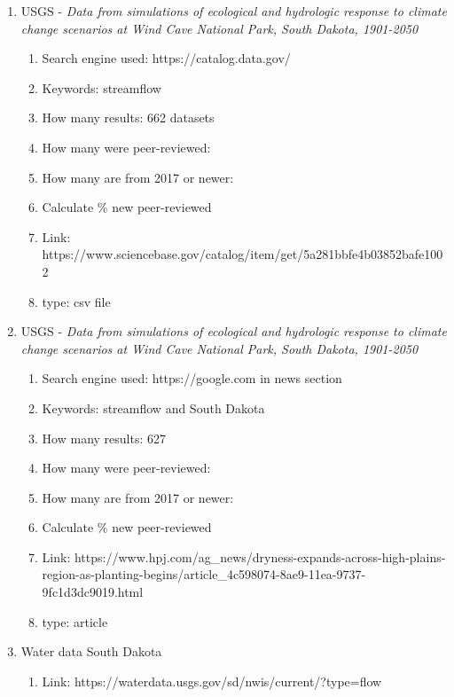 \documentclass{article}
\begin{document}
\begin{enumerate}
        
    \item USGS - \textit{Data from simulations of ecological and hydrologic response to climate change scenarios at Wind Cave National Park, South Dakota, 1901-2050}
        \begin{enumerate}
            \item Search engine used: https://catalog.data.gov/
            \item Keywords: streamflow 
            \item How many results: 662 datasets 
            \item How many were peer-reviewed: 
            \item How many are from 2017 or newer: 
            \item Calculate \% new peer-reviewed 
            \item Link: https://www.sciencebase.gov/catalog/item/get/5a281bbfe4b03852bafe1002
            \item type: csv file 
        \end{enumerate}


    \item USGS - \textit{Data from simulations of ecological and hydrologic response to climate change scenarios at Wind Cave National Park, South Dakota, 1901-2050}
        \begin{enumerate}
            \item Search engine used: https://google.com in news section
            \item Keywords: streamflow and South Dakota 
            \item How many results: 627 
            \item How many were peer-reviewed: 
            \item How many are from 2017 or newer: 
            \item Calculate \% new peer-reviewed 
            \item Link: https://www.hpj.com/ag_news/dryness-expands-across-high-plains-region-as-planting-begins/article_4c598074-8ae9-11ea-9737-9fc1d3dc9019.html
            \item type: article 
        \end{enumerate}


    \item Water data South Dakota
        \begin{enumerate}
            \item Link: https://waterdata.usgs.gov/sd/nwis/current/?type=flow
        \end{enumerate}
       
    
    

\end{enumerate}
\end{document}
